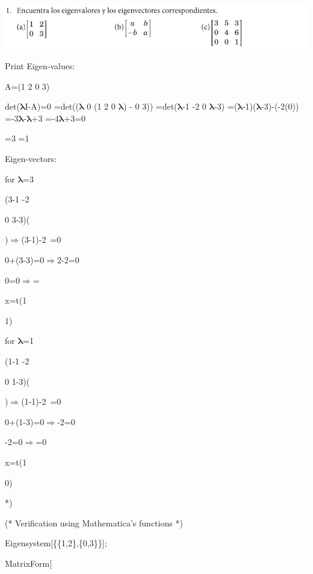 \documentclass[11pt,a4paper]{article}
\begin{document}
\includegraphics[width=1\textwidth]{./img/Capture1.png}

\begin{mmaCell}[]{Print}
Eigen-values:

A=(1  2
   0  3)
   
det(\(\pmb{\lambda}\)I-A)=0
         =det((\(\pmb{\lambda}\)  0    (1  2
               0  \(\pmb{\lambda}\)) -  0  3))
         =det(\(\pmb{\lambda}\)-1  -2
              0    \(\pmb{\lambda}\)-3)
         =(\(\pmb{\lambda}\)-1)(\(\pmb{\lambda}\)-3)-(-2(0))
         =-3\(\pmb{\lambda}\)-\(\pmb{\lambda}\)+3
         =-4\(\pmb{\lambda}\)+3=0
  
=3
=1

  

  Eigen-vectors:

  for \(\pmb{\lambda}\)=3

  (3-1	-2

  0	3-3)(

  )\(\pmb{\Rightarrow}\)(3-1)-2\
=0

  0+(3-3)=0\(\pmb{\Rightarrow}\)2-2=0

  0=0\(\pmb{\Rightarrow}\)=

  x=t(1

  1)

  for \(\pmb{\lambda}\)=1

  (1-1	-2

  0	1-3)(

  )\(\pmb{\Rightarrow}\)(1-1)-2\
=0

  0+(1-3)=0\(\pmb{\Rightarrow}\)-2=0

  -2\mmaSub{x}{2}=0\(\pmb{\Rightarrow}\)\mmaSub{x}{2}=0

  x=t(1

  0)

  *)

  (* Verification using Mathematica's functions *)

  Eigensystem[\{\{1,2\},\{0,3\}\}];

  MatrixForm[%

\end{mmaCell}
\end{document}
